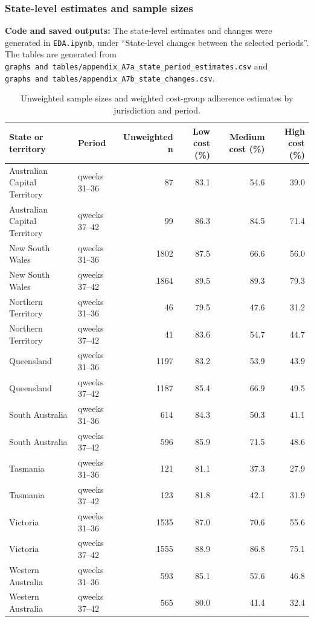 \documentclass[
  12pt,
  a4paper,
]{article}
\begin{document}
\clearpage

\subsubsection{State-level estimates and sample sizes}\label{state-level-estimates-and-sample-sizes}

\textbf{Code and saved outputs:} The state-level estimates and changes were
generated in \texttt{EDA.ipynb}, under ``State-level changes between the
selected periods''. The tables are generated from
\texttt{graphs\ and\ tables/appendix\_A7a\_state\_period\_estimates.csv} and
\texttt{graphs\ and\ tables/appendix\_A7b\_state\_changes.csv}.

\begin{landscape}
\scriptsize


\begin{longtable}[t]{llrrrr}
\caption{\label{tab:state-estimates}Unweighted sample sizes and weighted cost-group adherence estimates by jurisdiction and period.}\\
\toprule
State or territory & Period & Unweighted n & Low cost (\%) & Medium cost (\%) & High cost (\%)\\
\midrule
Australian Capital Territory & qweeks 31--36 & 87 & 83.1 & 54.6 & 39.0\\
Australian Capital Territory & qweeks 37--42 & 99 & 86.3 & 84.5 & 71.4\\
New South Wales & qweeks 31--36 & 1802 & 87.5 & 66.6 & 56.0\\
New South Wales & qweeks 37--42 & 1864 & 89.5 & 89.3 & 79.3\\
Northern Territory & qweeks 31--36 & 46 & 79.5 & 47.6 & 31.2\\
\addlinespace
Northern Territory & qweeks 37--42 & 41 & 83.6 & 54.7 & 44.7\\
Queensland & qweeks 31--36 & 1197 & 83.2 & 53.9 & 43.9\\
Queensland & qweeks 37--42 & 1187 & 85.4 & 66.9 & 49.5\\
South Australia & qweeks 31--36 & 614 & 84.3 & 50.3 & 41.1\\
South Australia & qweeks 37--42 & 596 & 85.9 & 71.5 & 48.6\\
\addlinespace
Tasmania & qweeks 31--36 & 121 & 81.1 & 37.3 & 27.9\\
Tasmania & qweeks 37--42 & 123 & 81.8 & 42.1 & 31.9\\
Victoria & qweeks 31--36 & 1535 & 87.0 & 70.6 & 55.6\\
Victoria & qweeks 37--42 & 1555 & 88.9 & 86.8 & 75.1\\
Western Australia & qweeks 31--36 & 593 & 85.1 & 57.6 & 46.8\\
\addlinespace
Western Australia & qweeks 37--42 & 565 & 80.0 & 41.4 & 32.4\\
\bottomrule
\end{longtable}



\end{landscape}
\end{document}
